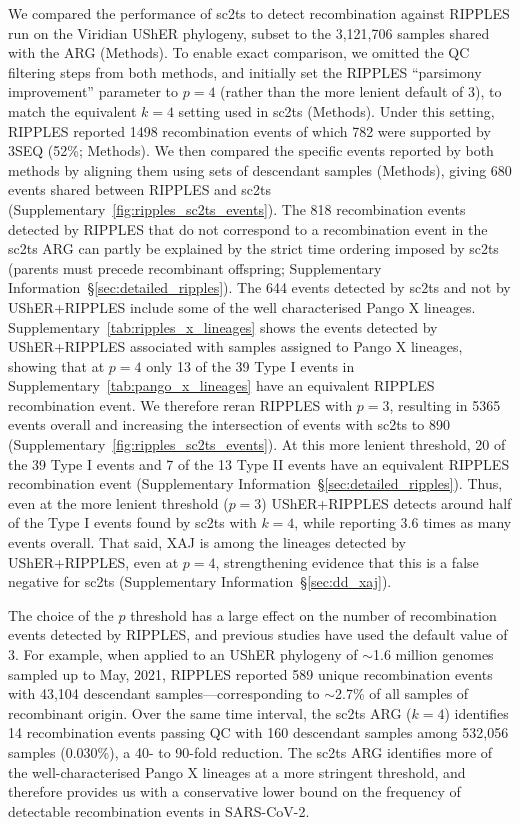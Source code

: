 \documentclass[12pt]{article}
\newcommand{\supref}[1]{Supplementary Information~\S\ref{#1}}
\newcommand{\siref}[1]{Supplementary~\ref{#1}}
\begin{document}
We compared the performance of sc2ts to detect recombination
against RIPPLES run on the Viridian UShER phylogeny,
subset to the 3,121,706 samples shared with the ARG (Methods).
To enable exact comparison, we omitted the QC filtering steps from both
methods, and initially set the RIPPLES ``parsimony improvement''
parameter to $p=4$ (rather than the more lenient default of 3),
to match the equivalent $k=4$ setting used in sc2ts (Methods).
Under this setting,
RIPPLES reported 1498 recombination events of which
782 were supported by 3SEQ (52\%; Methods).
We then compared
the specific events reported by both methods by aligning them
using sets of descendant samples (Methods),
giving 680 events shared between RIPPLES and sc2ts (\siref{fig:ripples_sc2ts_events}).
The 818 recombination events detected by RIPPLES that do not
correspond to a recombination event in the sc2ts ARG can partly
be explained by the strict time ordering imposed by sc2ts
(parents must precede recombinant offspring;
\supref{sec:detailed_ripples}).
The 644 events detected by sc2ts and not by UShER+RIPPLES
 include some of the well characterised Pango X lineages.
\siref{tab:ripples_x_lineages} shows the events detected
by UShER+RIPPLES associated with samples assigned to Pango X
lineages, showing that at $p=4$
only 13 of the 39 Type I events in \siref{tab:pango_x_lineages}
have an equivalent RIPPLES recombination event.
We therefore reran RIPPLES with $p=3$, resulting in 5365 events overall
and increasing the intersection of events with sc2ts to 890
(\siref{fig:ripples_sc2ts_events}).
At this more lenient threshold, 20 of the 39 Type I events
and 7 of the 13 Type II events
have an equivalent RIPPLES recombination event
(\supref{sec:detailed_ripples}).
Thus, even at the more lenient threshold ($p=3$) UShER+RIPPLES detects
around half of the Type I events found by sc2ts with $k=4$, while
reporting 3.6 times as many events overall. That said, XAJ is among the
lineages detected by
UShER+RIPPLES, even at $p=4$, strengthening evidence that this is a false
negative for sc2ts (\supref{sec:dd_xaj}).

The choice of the $p$ threshold has a large effect
on the number of recombination events detected by RIPPLES, and
previous studies have used the default value of
$3$\cite{Turakhia2022,Smith2023tracking}.
For example, when applied to an UShER phylogeny of
$\sim$1.6 million genomes sampled up to May, 2021,
RIPPLES reported 589 unique recombination events with 43,104 descendant
samples---corresponding to $\sim$2.7\% of all samples of recombinant origin.
Over the same time interval, the sc2ts ARG ($k=4$) identifies
14 recombination events passing QC with
160 descendant samples among 532,056 samples (0.030\%),
a 40- to 90-fold reduction.
The sc2ts ARG identifies more of the well-characterised Pango X lineages
at a more stringent threshold, and therefore provides us with a
conservative lower bound
on the frequency of detectable recombination events in SARS-CoV-2.
\end{document}
